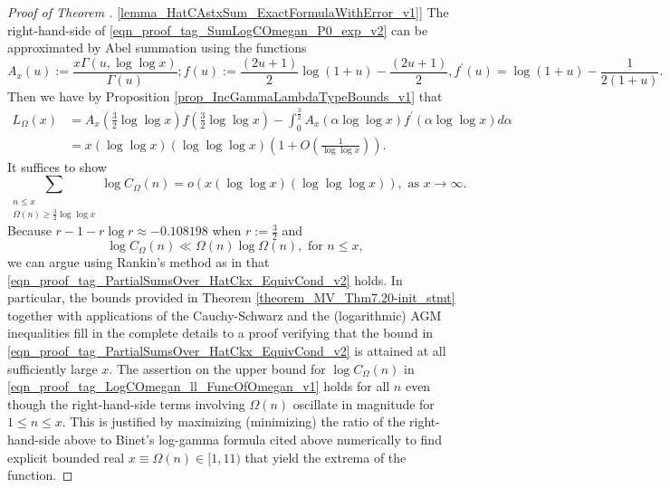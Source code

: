 \documentclass[11pt,reqno,a4letter]{article}
\newcommand{\hlocalref}[1]{\hyperref[#1]{\ref{#1}}}
\numberwithin{equation}{section}
\numberwithin{figure}{section}
\numberwithin{table}{section}
\theoremstyle{plain}
\numberwithin{theorem}{section}
\theoremstyle{definition}
\begin{document}
\begin{proof}[Proof of Theorem \hlocalref{lemma_HatCAstxSum_ExactFormulaWithError_v1}]
The right-hand-side of \eqref{eqn_proof_tag_SumLogCOmegan_P0_exp_v2} can be 
approximated by Abel summation using the functions 
\[
A_x(u) := \frac{x \Gamma\left(u, \log\log x\right)}{\Gamma\left(u\right)}; 
     f(u) := \frac{(2u+1)}{2} \log\left(1 + u\right) - \frac{(2u+1)}{2}, 
     f^{\prime}(u) = \log\left(1 + u\right) - \frac{1}{2\left(1 + u\right)}. 
\]
Then we have by 
Proposition \hlocalref{prop_IncGammaLambdaTypeBounds_v1} that 
\begin{align*}
L_{\Omega}(x) & = A_x\left(\frac{3}{2}\log\log x\right) f\left(\frac{3}{2}\log\log x\right) - 
	\int_0^{\frac{3}{2}} A_x(\alpha \log\log x) f^{\prime}(\alpha \log\log x) d\alpha \\ 
	& = 
	x (\log\log x)(\log\log\log x) \left(1 + O\left(\frac{1}{\log\log x}\right)\right). 
\end{align*}
It suffices to show 
\begin{equation}
\label{eqn_proof_tag_PartialSumsOver_HatCkx_EquivCond_v2}
\sum_{\substack{n \leq x \\ \Omega(n) \geq \frac{3}{2} \log\log x}} 
	\log C_{\Omega}(n)= o\left(x (\log\log x) (\log\log\log x)\right), 
	\text{ as } x \rightarrow \infty. 
\end{equation}
Because $r-1-r\log r \approx -0.108198$ when $r := \frac{3}{2}$ and 
\begin{equation}
\label{eqn_proof_tag_LogCOmegan_ll_FuncOfOmegan_v1}
\log C_{\Omega}(n) \ll \Omega(n) \log \Omega(n), \text{ for } n \leq x,
\end{equation}
we can argue using Rankin's method as in \cite[Thm.~7.20; \S 7.4]{MV} that 
\eqref{eqn_proof_tag_PartialSumsOver_HatCkx_EquivCond_v2} holds. 
In particular, the bounds provided in 
Theorem \hlocalref{theorem_MV_Thm7.20-init_stmt} 
together with applications of the Cauchy-Schwarz and 
the (logarithmic) AGM inequalities fill in the 
complete details to a proof verifying that the bound in 
\eqref{eqn_proof_tag_PartialSumsOver_HatCkx_EquivCond_v2} 
is attained at all sufficiently large $x$. 
The assertion on the upper bound for $\log C_{\Omega}(n)$ in 
\eqref{eqn_proof_tag_LogCOmegan_ll_FuncOfOmegan_v1} holds 
for all $n$ even though the right-hand-side terms involving $\Omega(n)$ 
oscillate in magnitude for $1 \leq n \leq x$. This is justified by 
maximizing (minimizing) the ratio of the right-hand-side above to 
Binet's log-gamma formula cited above 
numerically to find explicit bounded real $x \equiv \Omega(n) \in [1, 11)$ 
that yield the extrema of the function.
\end{proof} 
\end{document}
